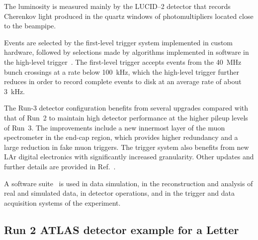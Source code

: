 The luminosity is measured mainly by the LUCID--2 detector that records Cherenkov light produced in the quartz windows of photomultipliers located close to the beampipe.

Events are selected by the first-level trigger system implemented in custom hardware,
followed by selections made by algorithms implemented in software in the high-level trigger~\cite{TRIG-2016-01}. 
The first-level trigger accepts events from the \qty{40}{\MHz} bunch crossings at a rate below \qty{100}{\kHz},
which the high-level trigger further reduces in order to record complete events to disk at an average rate of about \qty{3}{\kHz}.

The Run-3 detector configuration benefits from several upgrades compared with that of Run~2 to maintain high detector performance at the higher pileup levels of Run~3. The improvements include a new innermost layer of the muon spectrometer in the end-cap region, which provides higher redundancy and a large reduction in fake muon triggers. The trigger system also benefits from new LAr digital electronics with significantly increased granularity. Other updates and further details are provided in Ref.~\cite{GENR-2019-02}.

A software suite~\cite{SOFT-2022-02} is used in data simulation, in the reconstruction
and analysis of real and simulated data, in detector operations, and in the trigger and data acquisition
systems of the experiment.

\subsection{Run 2 ATLAS detector example for a Letter}
\label{sec:atlas2a}

